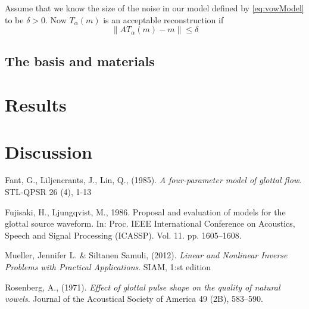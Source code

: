 \documentclass[12pt,a4]{article}
\newcommand{\lnorm}{\left\|}
\newcommand{\rnorm}{\right\|}
\begin{document}
Assume that we know the size of the noise in our model defined by \eqref{eq:vowModel} to be $\delta > 0$. Now $T_\alpha(m)$ is an acceptable reconstruction if 
\begin{equation}
\lnorm AT_\alpha(m)-m\rnorm \leq \delta
\end{equation}

\subsection{The basis and materials}\label{sec:basis}
\section{Results}\label{sec:results}


\section{Discussion}\label{sec:discussion}

\newpage
\begin{thebibliography}{9}

    Fant, G., Liljencrants, J., Lin, Q., (1985).
    \emph{A four-parameter model of glottal flow}.
    STL-QPSR 26 (4), 1-13
    
    Fujisaki, H., Ljungqvist, M., 1986.
    Proposal and evaluation of models for the glottal source waveform.
    In: Proc. IEEE International Conference on Acoustics, Speech and Signal Processing (ICASSP). Vol. 11. pp. 1605–1608.
    
	Mueller, Jennifer L. \& Siltanen Samuli, (2012).
	\emph{Linear and Nonlinear Inverse Problems with Practical Applications}.
	SIAM, 1:st edition

    Rosenberg, A., (1971).
    \emph{Effect of glottal pulse shape on the quality of natural vowels}.
    Journal of the Acoustical Society of America 49 (2B), 583–590.

\end{thebibliography}
\end{document}

